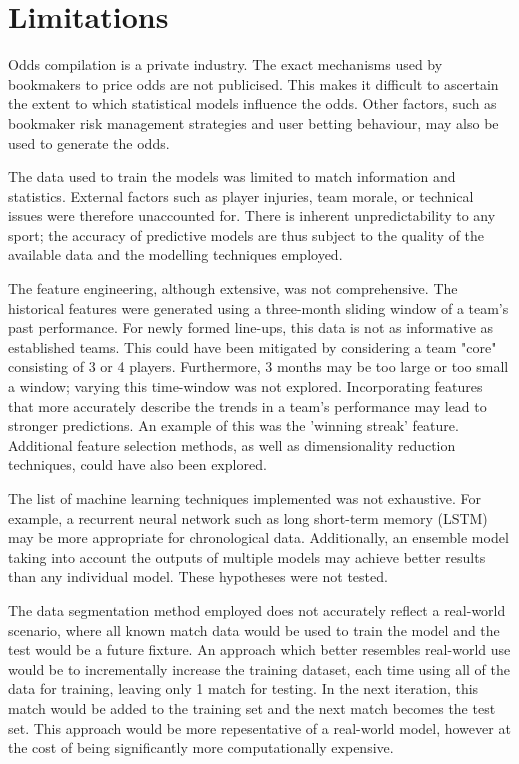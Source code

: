 \section{Limitations}

Odds compilation is a private industry. The exact mechanisms used by bookmakers to price odds are not publicised. This makes it difficult to ascertain the extent to which statistical models influence the odds. Other factors, such as bookmaker risk management strategies and user betting behaviour, may also be used to generate the odds.

The data used to train the models was limited to match information and statistics. External factors such as player injuries, team morale, or technical issues were therefore unaccounted for. There is inherent unpredictability to any sport; the accuracy of predictive models are thus subject to the quality of the available data and the modelling techniques employed.

The feature engineering, although extensive, was not comprehensive. The historical features were generated using a three-month sliding window of a team's past performance. For newly formed line-ups, this data is not as informative as established teams. This could have been mitigated by considering a team "core" consisting of 3 or 4 players. Furthermore, 3 months may be too large or too small a window; varying this time-window was not explored. Incorporating features that more accurately describe the trends in a team's performance may lead to stronger predictions. An example of this was the 'winning streak' feature. Additional feature selection methods, as well as dimensionality reduction techniques, could have also been explored.

The list of machine learning techniques implemented was not exhaustive. For example, a recurrent neural network such as long short-term memory (LSTM) may be more appropriate for chronological data. Additionally, an ensemble model taking into account the outputs of multiple models may achieve better results than any individual model. These hypotheses were not tested.

The data segmentation method employed does not accurately reflect a real-world scenario, where all known match data would be used to train the model and the test would be a future fixture. An approach which better resembles real-world use would be to incrementally increase the training dataset, each time using all of the data for training, leaving only 1 match for testing. In the next iteration, this match would be added to the training set and the next match becomes the test set. This approach would be more repesentative of a real-world model, however at the cost of being significantly more computationally expensive.

